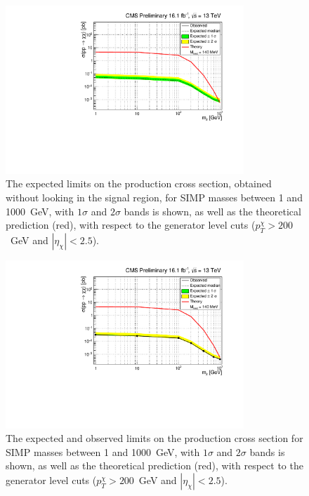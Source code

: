 \begin{figure}[ht]
  \centering
  \includegraphics[width=0.8\textwidth]{figures/ExclusionLimitGH_xsecVsM_ChF0p05_1leg_HybridNew_gmN_neutrons.pdf}\hfill%
  \caption{The expected limits on the production cross section, obtained without looking in the signal region, for \ac{SIMP} masses between 1 and 1000~GeV, with $1\sigma$ and $2\sigma$ bands is shown, as well as the theoretical prediction (red), with respect to the generator level cuts ($p_T^{\chi} > 200$~GeV and $|\eta_{\chi}| < 2.5$).}
  \label{fig:SIMP_limit}
\end{figure}

\begin{figure}[ht]
  \centering
  \includegraphics[width=0.8\textwidth]{figures/ExclusionLimitGH_xsecVsM_ChF0p05_1leg_HybridNew_gmN_neutrons_unblinded.pdf}\hfill%
  \caption{The expected and observed limits on the production cross section for \ac{SIMP} masses between 1 and 1000~GeV, with $1\sigma$ and $2\sigma$ bands is shown, as well as the theoretical prediction (red), with respect to the generator level cuts ($p_T^{\chi} > 200$~GeV and $|\eta_{\chi}| < 2.5$).}
  \label{fig:SIMP_limit_unblinded}
\end{figure}

\clearpage


\clearpage{\pagestyle{empty}\cleardoublepage}
